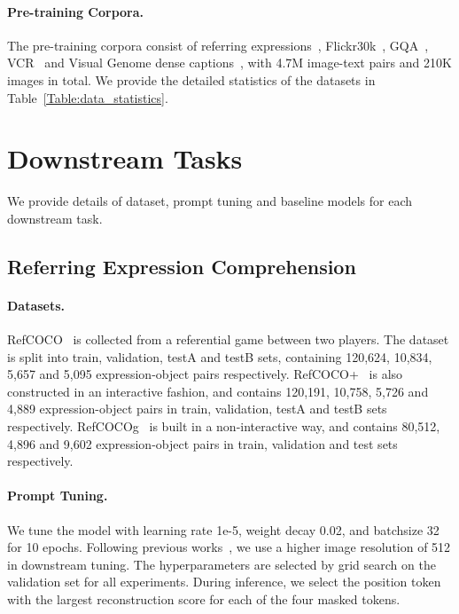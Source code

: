\documentclass[11pt]{article}
\begin{document}
\paragraph{Pre-training Corpora.} The pre-training corpora consist of referring expressions~\cite{yu2016modeling,mao2016generation}, Flickr30k~\cite{plummer2015flickr30k}, GQA~\cite{hudson2019gqa}, VCR~\cite{zellers2019recognition} and Visual Genome dense captions~\cite{krishna2017visual}, with 4.7M image-text pairs and 210K images in total. We provide the detailed statistics of the datasets in Table~\ref{Table:data_statistics}. 


\section{Downstream Tasks}
We provide details of dataset, prompt tuning and baseline models for each downstream task.
\subsection{Referring Expression Comprehension} 

\paragraph{Datasets.} RefCOCO~\cite{yu2016modeling} is collected from a referential game between two players. The dataset is split into train, validation, testA and testB sets, containing 120,624, 10,834, 5,657 and 5,095 expression-object pairs respectively. RefCOCO+~\cite{yu2016modeling} is also constructed in an interactive fashion, and contains 120,191, 10,758, 5,726 and 4,889 expression-object pairs in train, validation, testA and testB sets respectively. RefCOCOg~\cite{mao2016generation} is built in a non-interactive way, and contains 80,512, 4,896 and 9,602 expression-object pairs in train, validation and test sets respectively.

\paragraph{Prompt Tuning.} We tune the model with learning rate 1e-5, weight decay 0.02, and batchsize 32 for 10 epochs. Following previous works~\cite{dosovitskiy2020image,li2021align}, we use a higher image resolution of 512 in downstream tuning. The hyperparameters are selected by grid search on the validation set for all experiments. During inference, we select the position token with the largest reconstruction score for each of the four masked tokens. 
\end{document}
